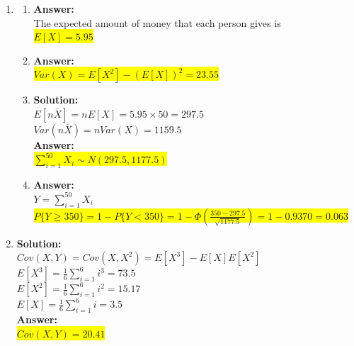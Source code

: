 \documentclass{article}
\newcommand{\myansw}{\textbf{Answer:}\\}
\newcommand{\mysolu}{\textbf{Solution:}\\}
\begin{document}
\begin{enumerate}
\begin{enumerate}
		
		
	\end{enumerate}
	\item
	\begin{enumerate}
	\item
		\myansw
		The expected amount of money that each person gives is\\
		\colorbox{yellow}{${E[X] = 5.95}$}\\
		\item
		\myansw
		\colorbox{yellow}{${Var(X) = E[X^2]-(E[X])^2 = 23.55}$}\\
		\item
		\mysolu
		${E[n\overline{X}]= nE[X]= 5.95 \times 50 =297.5}$\\
		${Var(n\overline{X}) = nVar(X)=1159.5}$\\
		\myansw
		\colorbox{yellow}{${\sum\limits_{i = 1}^{50}X_i \sim N(297.5, 1177.5)}$}\\		
		\item
		\myansw
		${Y = \sum\limits_{i = 1}^{50}X_i}$\\
		\colorbox{yellow}{${P\{Y \geq 350\} = 1 - P\{Y < 350\} = 1 - \Phi(\frac{350 - 297.5}{\sqrt{1177.5}}) = 1 - 0.9370  = 0.063}$}
		

	\end{enumerate}
	\item
	\mysolu 
	${Cov(X,Y) = Cov(X,X^2) = E[X^3] - E[X]E[X^2]}$\\
	$E[X^3] = \frac{1}{6}\sum\limits_{i = 1}^{6}i^3 = 73.5$\\
	$E[X^2] = \frac{1}{6}\sum\limits_{i = 1}^{6}i^2 = 15.17$\\
	$E[X] =\frac{1}{6}\sum\limits_{i = 1}^{6}i = 3.5 $\\
	\myansw
	\colorbox{yellow}{${Cov(X,Y) = 20.41}$}\\
	

\end{enumerate}
\end{document}
